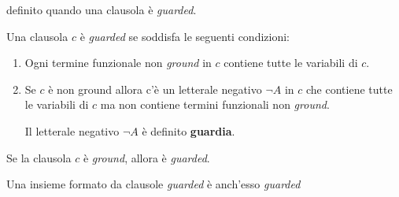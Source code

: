definito quando una clausola è \emph{guarded}.
\begin{definition}
    Una clausola $c$ è \emph{guarded} se soddisfa le seguenti condizioni:
    \begin{enumerate}
        \item Ogni termine funzionale non \emph{ground} in $c$ contiene tutte le variabili di $c$.
        \item Se $c$ è non ground allora c'è un letterale negativo $\lnot A$ in $c$ che contiene tutte le variabili di $c$ ma 
        non contiene termini funzionali non \emph{ground}.

        Il letterale negativo $\lnot A$ è definito \textbf{guardia}.
    \end{enumerate}
    Se la clausola $c$ è \emph{ground}, allora è \emph{guarded}.
\end{definition}
\begin{definition}
    Una insieme formato da clausole \emph{guarded} è anch'esso \emph{guarded}
\end{definition}
